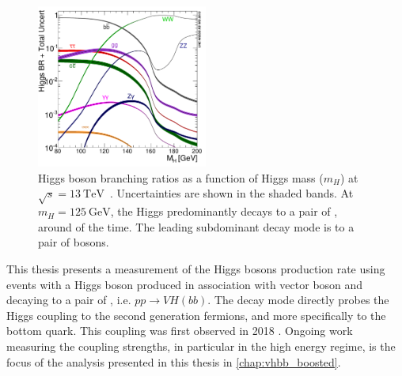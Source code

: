 \begin{figure}[!htbp]
  \centering
  \includegraphics[width=0.5\textwidth]{chapters/1.theory/figs/Higgs_BR_LM.pdf}
  \caption{
    Higgs boson branching ratios as a function of Higgs mass ($m_H$) at $\sqrt{s} = \SI{13}{\TeV}$~\cite{deFlorian:2016spz}.
    Uncertainties are shown in the shaded bands.
    At $m_H = \SI{125}{\GeV}$, the Higgs predominantly decays to a pair of \bquarks, around  of the time.
    The leading subdominant decay mode is to a pair of \Wboson bosons.
    }
  \label{fig:higgs_br}
\end{figure}

This thesis presents a measurement of the Higgs bosons production rate using events with a Higgs boson produced in association with vector boson and decaying to a pair of \bquarks, i.e. $pp \rightarrow VH(bb)$.
The \Hbb decay mode directly probes the Higgs coupling to the second generation fermions, and more specifically to the bottom quark.
This coupling was first observed in 2018 \cite{ATLAS-CONF-2018-036,CMS-HIG-18-016}.
Ongoing work measuring the coupling strengths, in particular in the high energy regime, is the focus of the analysis presented in this thesis in \cref{chap:vhbb_boosted}.
